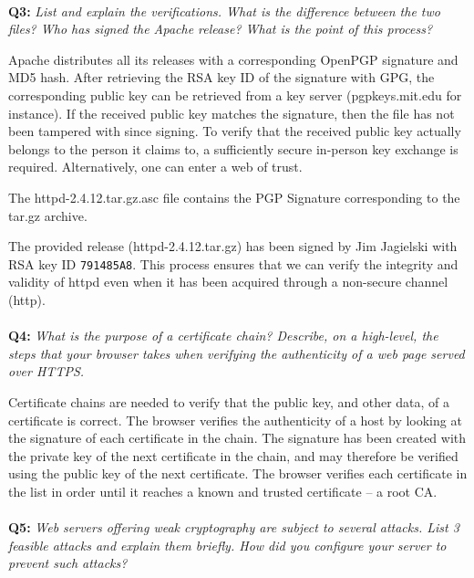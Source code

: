 \paragraph{}
\textbf{Q3:}
\textit{List and explain the verifications. What is the difference between the two files? Who has signed the Apache release? What is the point of this process?}

Apache distributes all its releases with a corresponding OpenPGP signature\cite{pgp} and MD5 hash.
After retrieving the RSA key ID of the signature with GPG\cite{gpg}, the corresponding public key can be retrieved from a key server (pgpkeys.mit.edu for instance).
If the received public key matches the signature, then the file has not been tampered with since signing.
To verify that the received public key actually belongs to the person it claims to, a sufficiently secure in-person key exchange is required.
Alternatively, one can enter a web of trust.

The httpd-2.4.12.tar.gz.asc file contains the PGP Signature corresponding to the tar.gz archive.

The provided release (httpd-2.4.12.tar.gz) has been signed by Jim Jagielski with RSA key ID \verb/791485A8/.
This process ensures that we can verify the integrity and validity of httpd even when it has been acquired through a non-secure channel (http).

\paragraph{}
\textbf{Q4:}
\textit{What is the purpose of a certificate chain? Describe, on a high-level, the steps that your browser takes when verifying the authenticity of a web page served over HTTPS.}

Certificate chains are needed to verify that the public key, and other data, of a certificate is correct.
The browser verifies the authenticity of a host by looking at the signature of each certificate in the chain.
The signature has been created with the private key of the next certificate in the chain, and may therefore be verified using the public key of the next certificate.
The browser verifies each certificate in the list in order until it reaches a known and trusted certificate – a root CA.\cite{x509}

\paragraph{}
\textbf{Q5:}
\textit{Web servers offering weak cryptography are subject to several attacks. List 3 feasible attacks and explain them briefly. How did you configure your server to prevent such attacks?}

